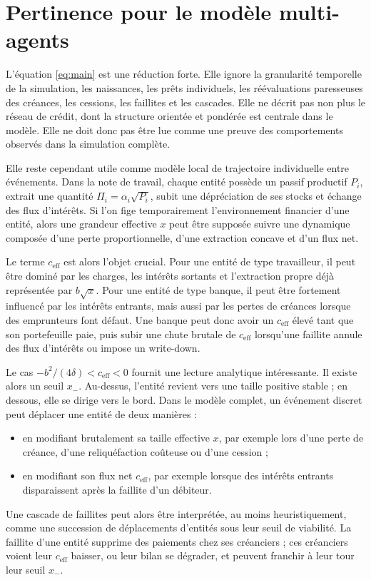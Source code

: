 \documentclass[11pt,a4paper]{article}
\begin{document}
\section{Pertinence pour le modèle multi-agents}

L'équation \eqref{eq:main} est une réduction forte. Elle ignore la granularité temporelle de la simulation, les naissances, les prêts individuels, les réévaluations paresseuses des créances, les cessions, les faillites et les cascades. Elle ne décrit pas non plus le réseau de crédit, dont la structure orientée et pondérée est centrale dans le modèle. Elle ne doit donc pas être lue comme une preuve des comportements observés dans la simulation complète.

Elle reste cependant utile comme modèle local de trajectoire individuelle entre événements. Dans la note de travail, chaque entité possède un passif productif \(P_i\), extrait une quantité \(\Pi_i=\alpha_i\sqrt{P_i}\), subit une dépréciation de ses stocks et échange des flux d'intérêts. Si l'on fige temporairement l'environnement financier d'une entité, alors une grandeur effective \(x\) peut être supposée suivre une dynamique composée d'une perte proportionnelle, d'une extraction concave et d'un flux net.

Le terme \(c_{\mathrm{eff}}\) est alors l'objet crucial. Pour une entité de type travailleur, il peut être dominé par les charges, les intérêts sortants et l'extraction propre déjà représentée par \(b\sqrt{x}\). Pour une entité de type banque, il peut être fortement influencé par les intérêts entrants, mais aussi par les pertes de créances lorsque des emprunteurs font défaut. Une banque peut donc avoir un \(c_{\mathrm{eff}}\) élevé tant que son portefeuille paie, puis subir une chute brutale de \(c_{\mathrm{eff}}\) lorsqu'une faillite annule des flux d'intérêts ou impose un write-down.

Le cas \(-b^2/(4\delta)<c_{\mathrm{eff}}<0\) fournit une lecture analytique intéressante. Il existe alors un seuil \(x_-\). Au-dessus, l'entité revient vers une taille positive stable ; en dessous, elle se dirige vers le bord. Dans le modèle complet, un événement discret peut déplacer une entité de deux manières :
\begin{itemize}
    \item en modifiant brutalement sa taille effective \(x\), par exemple lors d'une perte de créance, d'une reliquéfaction coûteuse ou d'une cession ;
    \item en modifiant son flux net \(c_{\mathrm{eff}}\), par exemple lorsque des intérêts entrants disparaissent après la faillite d'un débiteur.
\end{itemize}
Une cascade de faillites peut alors être interprétée, au moins heuristiquement, comme une succession de déplacements d'entités sous leur seuil de viabilité. La faillite d'une entité supprime des paiements chez ses créanciers ; ces créanciers voient leur \(c_{\mathrm{eff}}\) baisser, ou leur bilan se dégrader, et peuvent franchir à leur tour leur seuil \(x_-\).
\end{document}
